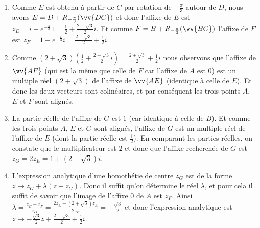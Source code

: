 \documentclass[a4paper,12pt,reqno]{amsart}
\begin{document}
\begin{solution}
  \begin{enumerate}
    \item Comme $E$ est obtenu à partir de $C$ par rotation de $-\frac{\pi}{3}$ autour de $D$, nous avons $E = D+R_{-\frac{\pi}{3}}(\vv{DC})$ et donc l'affixe de $E$ est $z_{E} = i+e^{-\frac{\pi}{3}}1 = \frac{1}{2} + \frac{2-\sqrt{3}}{2} i$. Et comme $F = B + R_{-\frac{\pi}{3}}(\vv{BC})$ l'affixe de $F$ est $z_{F} = 1 + e^{-\frac{\pi}{3}}i = \frac{2+\sqrt{3}}{2} + \frac{1}{2}i$.
    \item Comme $(2+\sqrt{3})\left(\frac{1}{2} + \frac{2-\sqrt{3}}{2} i\right) = \frac{2+\sqrt{3}}{2} + \frac{1}{2}i$ nous observons que l'affixe de $\vv{AF}$ (qui est la même que celle de $F$ car l'affixe de $A$ est $0$) est un multiple réel $(2+\sqrt{3})$ de l'affixe de $\vv{AE}$ (identique à celle de $E$). Et donc les deux vecteurs sont colinéaires, et par conséquent les trois points $A$, $E$ et $F$ sont alignés.
    \item La partie réelle de l'affixe de $G$ est $1$ (car identique à celle de $B$). Et comme les trois points $A$, $E$ et $G$ sont alignés, l'affixe de $G$ est un multiple réel de l'affixe de $E$ (dont la partie réelle est $\frac{1}{2}$). En comparant les parties réelles, on constate que le multiplicateur est $2$ et donc que l'affixe recherchée de $G$ est $z_{G} = 2 z_{E} = 1+(2-\sqrt{3}) i$.
    \item L'expression analytique d'une homothétie de centre $z_{G}$ est de la forme $z \mapsto z_{G} + \lambda (z-z_{G})$. Donc il suffit qu'on détermine le réel $\lambda$, et pour cela il suffit de savoir que l'image de l'affixe $0$ de $A$ est $z_{F}$. Ainsi $\lambda = \frac{z_{G}-z_{F}}{z_{G}} = \frac{2z_{E}-(2+\sqrt{3})z_{E}}{2z_{E}} = -\frac{\sqrt{3}}{2}$ et donc l'expression analytique est $ z \mapsto -\frac{\sqrt{3}}{2}z + \frac{2+\sqrt{3}}{2} + \frac{1}{2}i $.
  \end{enumerate}
\end{solution}
\end{document}
